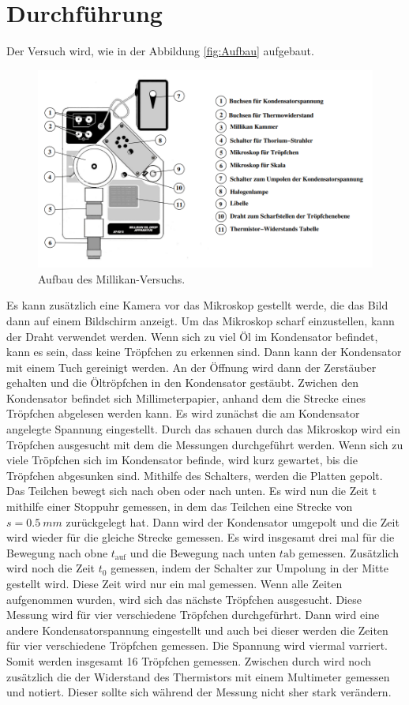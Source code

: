 \section{Durchführung}
\label{sec:Durchführung}

Der Versuch wird, wie in der Abbildung \ref{fig:Aufbau} aufgebaut.
\begin{figure}[H]
    \centering
    \includegraphics[scale=0.5]{content/Aufbau.png}
    \caption{Aufbau des Millikan-Versuchs.}
    \label{fig:Ftröpfchen}
\end{figure}

Es kann zusätzlich eine Kamera vor das Mikroskop gestellt werde, die das Bild dann auf einem Bildschirm anzeigt.
Um das Mikroskop scharf einzustellen, kann der Draht verwendet werden.
Wenn sich zu viel Öl im Kondensator befindet, kann es sein, dass keine Tröpfchen zu erkennen sind.
Dann kann der Kondensator mit einem Tuch gereinigt werden.
An der Öffnung wird dann der Zerstäuber gehalten und die Öltröpfchen in den Kondensator gestäubt.
Zwichen den Kondensator befindet sich Millimeterpapier, anhand dem die Strecke eines Tröpfchen abgelesen werden kann.
Es wird zunächst die am Kondensator angelegte Spannung eingestellt.
Durch das schauen durch das Mikroskop wird ein Tröpfchen ausgesucht mit dem die Messungen durchgeführt werden.
Wenn sich zu viele Tröpfchen sich im Kondensator befinde, wird kurz gewartet, bis die Tröpfchen abgesunken sind.
Mithilfe des Schalters, werden die Platten gepolt. Das Teilchen bewegt sich nach oben oder nach unten.
Es wird nun die Zeit t mithilfe einer Stoppuhr gemessen, in dem das Teilchen eine Strecke von $s = \qty{0.5}{mm}$ zurückgelegt hat.
Dann wird der Kondensator umgepolt und die Zeit wird wieder für die gleiche Strecke gemessen.
Es wird insgesamt drei mal für die Bewegung nach obne $t_\text{auf}$ und die Bewegung nach unten $t\text{ab}$ gemessen.
Zusätzlich wird noch die Zeit $t_0$ gemessen, indem der Schalter zur Umpolung in der Mitte gestellt wird.
Diese Zeit wird nur ein mal gemessen.
Wenn alle Zeiten aufgenommen wurden, wird sich das nächste Tröpfchen ausgesucht.
Diese Messung wird für vier verschiedene Tröpfchen durchgefürhrt.
Dann wird eine andere Kondensatorspannung eingestellt und auch bei dieser werden die Zeiten für vier verschiedene Tröpfchen gemessen.
Die Spannung wird viermal varriert.
Somit werden insgesamt 16 Tröpfchen gemessen.
Zwischen durch wird noch zusätzlich die der Widerstand des Thermistors mit einem Multimeter gemessen und notiert. Dieser sollte sich während der Messung nicht sher stark verändern.
